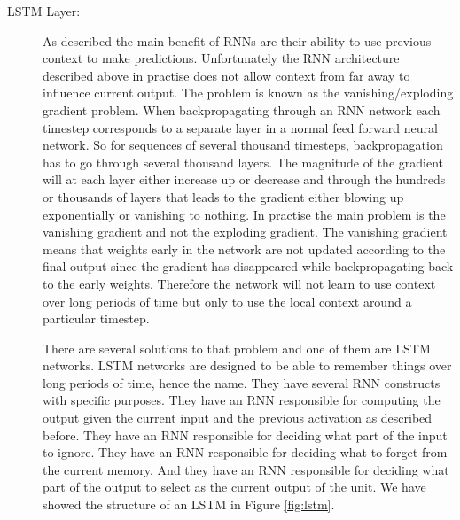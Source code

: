 \begin{description}
    \item[\gls{LSTM} Layer:]
        \label{layer:LSTM}

        As described the main benefit of \glspl{RNN} are their ability to use
        previous context to make predictions. Unfortunately the \gls{RNN}
        architecture described above in practise does not allow context from
        far away to influence current output. The problem is known as the
        vanishing/exploding gradient problem. When backpropagating through an
        \gls{RNN} network each timestep corresponds to a separate layer in a
        normal feed forward neural network. So for sequences of several thousand
        timesteps, backpropagation has to go through several thousand layers.
        The magnitude of the gradient will at each layer either increase up or
        decrease and through the hundreds or thousands of layers that leads to
        the gradient either blowing up exponentially or vanishing to nothing.
        In practise the main problem is the vanishing gradient and not the
        exploding gradient. The vanishing gradient means that weights early
        in the network are not updated according to the final output since
        the gradient has disappeared while backpropagating back to the early
        weights. Therefore the network will not learn to use context over long
        periods of time but only to use the local context around a particular
        timestep.

        There are several solutions to that problem and one of them are
        \gls{LSTM} networks. \gls{LSTM} networks are designed to be able to
        remember things over long periods of time, hence the name. They have
        several \gls{RNN} constructs with specific purposes. They have an
        \gls{RNN} responsible for computing the output given the current input
        and the previous activation as described before. They have an \gls{RNN}
        responsible for deciding what part of the input to ignore. They have
        an \gls{RNN} responsible for deciding what to forget from the current
        memory. And they have an \gls{RNN} responsible for deciding what part of
        the output to select as the current output of the unit. We have showed
        the structure of an \gls{LSTM} in Figure \ref{fig:lstm}.


\end{description}
